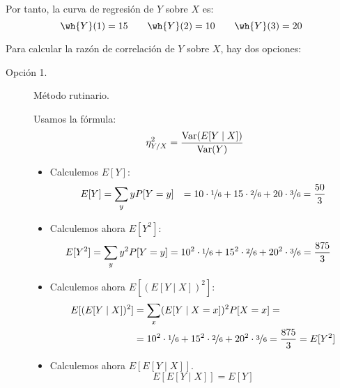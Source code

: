 \begin{ejercicio}
\begin{enumerate}
\begin{itemize}
            Por tanto, la curva de regresión de $Y$ sobre $X$ es:
            \begin{equation*}
                \wh{Y}(1) = 15 \qquad \wh{Y}(2) = 10 \qquad \wh{Y}(3) = 20
            \end{equation*}

            Para calcular la razón de correlación de $Y$ sobre $X$,
            hay dos opciones:
            \begin{description}
                \item[Opción 1.] Método rutinario.
                
                Usamos la fórmula:
                \begin{equation*}
                    \eta^2_{Y/X} = \dfrac{\operatorname{Var}(E[Y\mid X])}{\operatorname{Var}(Y)}
                \end{equation*}
                \begin{itemize}
                    \item Calculemos $E[Y]$:
                    \begin{align*}
                        E[Y] &= \sum_{y} y P[Y = y]
                        &= 10 \cdot \nicefrac{1}{6} + 15 \cdot \nicefrac{2}{6} + 20 \cdot \nicefrac{3}{6}
                        = \frac{50}{3}
                    \end{align*}

                    \item Calculemos ahora $E[Y^2]$:
                    \begin{align*}
                        E[Y^2] &= \sum_{y} y^2 P[Y = y]
                        = 10^2 \cdot \nicefrac{1}{6} + 15^2 \cdot \nicefrac{2}{6} + 20^2 \cdot \nicefrac{3}{6}
                        = \frac{875}{3}
                    \end{align*}

                    \item Calculemos ahora $E[(E[Y\mid X])^2]$:
                    \begin{align*}
                        E[(E[Y\mid X])^2] &= \sum_{x} (E[Y\mid X = x])^2 P[X = x]
                        =\\&= 10^2 \cdot \nicefrac{1}{6} + 15^2 \cdot \nicefrac{2}{6} + 20^2 \cdot \nicefrac{3}{6}
                        = \frac{875}{3} = E[Y^2]
                    \end{align*}

                    \item Calculemos ahora $E[E[Y\mid X]]$.
                    \begin{equation*}
                        E[E[Y\mid X]] = E[Y]
                    \end{equation*}
                \end{itemize}


\end{description}
\end{itemize}
\end{enumerate}
\end{ejercicio}
